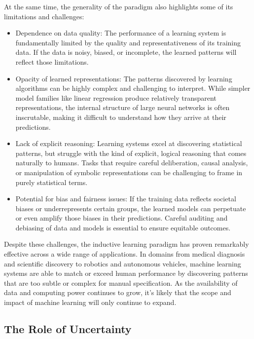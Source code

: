 \documentclass[
  9pt,
  letterpaper,
  abstract,
  titlepage]{scrbook}
\begin{document}
At the same time, the generality of the paradigm also highlights some of
its limitations and challenges:

\begin{itemize}
\item
  Dependence on data quality: The performance of a learning system is
  fundamentally limited by the quality and representativeness of its
  training data. If the data is noisy, biased, or incomplete, the
  learned patterns will reflect those limitations.
\item
  Opacity of learned representations: The patterns discovered by
  learning algorithms can be highly complex and challenging to
  interpret. While simpler model families like linear regression produce
  relatively transparent representations, the internal structure of
  large neural networks is often inscrutable, making it difficult to
  understand how they arrive at their predictions.
\item
  Lack of explicit reasoning: Learning systems excel at discovering
  statistical patterns, but struggle with the kind of explicit, logical
  reasoning that comes naturally to humans. Tasks that require careful
  deliberation, causal analysis, or manipulation of symbolic
  representations can be challenging to frame in purely statistical
  terms.
\item
  Potential for bias and fairness issues: If the training data reflects
  societal biases or underrepresents certain groups, the learned models
  can perpetuate or even amplify those biases in their predictions.
  Careful auditing and debiasing of data and models is essential to
  ensure equitable outcomes.
\end{itemize}

Despite these challenges, the inductive learning paradigm has proven
remarkably effective across a wide range of applications. In domains
from medical diagnosis and scientific discovery to robotics and
autonomous vehicles, machine learning systems are able to match or
exceed human performance by discovering patterns that are too subtle or
complex for manual specification. As the availability of data and
computing power continues to grow, it's likely that the scope and impact
of machine learning will only continue to expand.

\subsection{The Role of Uncertainty}\label{the-role-of-uncertainty}
\end{document}
